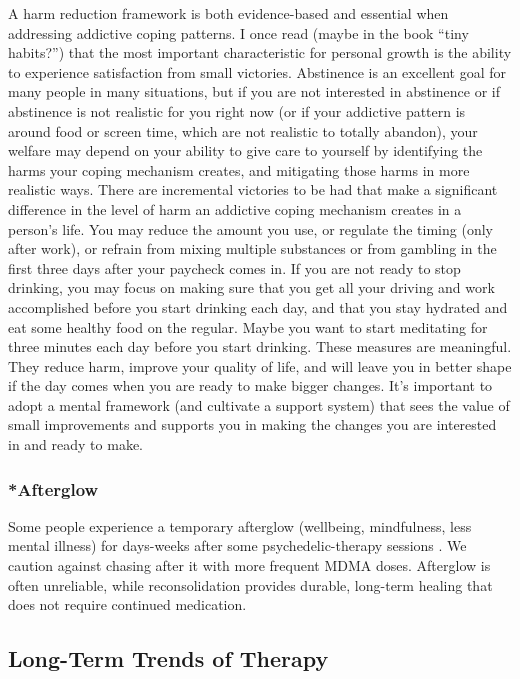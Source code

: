 \documentclass[12pt,letterpaper]{article}
\begin{document}
A harm reduction framework is both evidence-based and essential when addressing addictive coping patterns. I once read (maybe in the book “tiny habits?”) that the most important characteristic for personal growth is the ability to experience satisfaction from small victories. Abstinence is an excellent goal for many people in many situations, but if you are not interested in abstinence or if abstinence is not realistic for you right now (or if your addictive pattern is around food or screen time, which are not realistic to totally abandon), your welfare may depend on your ability to give care to yourself by identifying the harms your coping mechanism creates, and mitigating those harms in more realistic ways. There are incremental victories to be had that make a significant difference in the level of harm an addictive coping mechanism creates in a person's life. You may reduce the amount you use, or regulate the timing (only after work), or refrain from mixing multiple substances or from gambling in the first three days after your paycheck comes in. If you are not ready to stop drinking, you may focus on making sure that you get all your driving and work accomplished before you start drinking each day, and that you stay hydrated and eat some healthy food on the regular. Maybe you want to start meditating for three minutes each day before you start drinking. These measures are meaningful. They reduce harm, improve your quality of life, and will leave you in better shape if the day comes when you are ready to make bigger changes. It's important to adopt a mental framework (and cultivate a support system) that sees the value of small improvements and supports you in making the changes you are interested in and ready to make.
\subsubsection{*Afterglow}
Some people experience a temporary afterglow (wellbeing, mindfulness, less mental illness) for days-weeks after some psychedelic-therapy sessions \cite{evansAfterglow}. We caution against chasing after it with more frequent MDMA doses. Afterglow is often unreliable, while reconsolidation provides durable, long-term healing that does not require continued medication.
\subsection{Long-Term Trends of Therapy}
\end{document}
